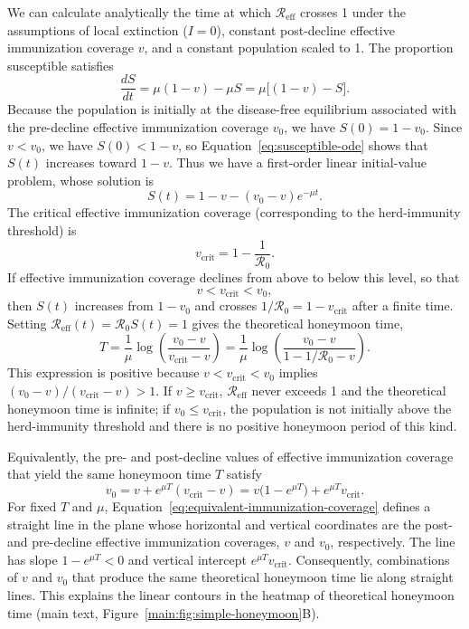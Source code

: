 \documentclass[12pt]{article}
\newcommand{\Rn}{{\mathcal R}_0}
\newcommand{\Reff}{{\mathcal R}_{\textrm{eff}}}
\newcommand{\vcrit}{v_{\textrm{crit}}}
\begin{document}
We can calculate analytically the time at which $\Reff$ crosses 1 under the assumptions of local extinction ($I=0$), constant post-decline effective immunization coverage $v$, and a constant population scaled to 1. The proportion susceptible satisfies
\begin{equation}
    \frac{dS}{dt}=\mu(1-v)-\mu S
    =\mu\bigl[(1-v)-S\bigr].
    \label{eq:susceptible-ode}
\end{equation}
Because the population is initially at the disease-free equilibrium associated with the pre-decline effective immunization coverage $v_0$, we have $S(0)=1-v_0$.  Since $v<v_0$, we have $S(0)<1-v$, so Equation~\eqref{eq:susceptible-ode} shows that $S(t)$ increases toward $1-v$.  Thus we have a first-order linear initial-value problem, whose solution is
\begin{equation}
    S(t)=1-v-(v_0-v)e^{-\mu t}.
    \label{eq:susceptible-solution}
\end{equation}
The critical effective immunization coverage (corresponding to the herd-immunity threshold) is
\begin{equation}
    \vcrit=1-\frac{1}{\Rn}.
    \label{eq:critical-immunization}
\end{equation}
If effective immunization coverage declines from above to below this level, so that
\begin{equation}
    v<\vcrit<v_0,
    \label{eq:finite-honeymoon-condition}
\end{equation}
then $S(t)$ increases from $1-v_0$ and crosses $1/\Rn=1-\vcrit$ after a finite time.  Setting $\Reff(t)=\Rn S(t)=1$ gives the theoretical honeymoon time,
\begin{equation}
    T=\frac{1}{\mu}
    \log\left(\frac{v_0-v}{\vcrit-v}\right)
    =\frac{1}{\mu}
    \log\left(\frac{v_0-v}{1-1/\Rn-v}\right).
    \label{eq:honeymoon-time}
\end{equation}
This expression is positive because $v<\vcrit<v_0$ implies $(v_0-v)/(\vcrit-v)>1$.  If $v\geq\vcrit$, $\Reff$ never exceeds 1 and the theoretical honeymoon time is infinite; if $v_0\leq\vcrit$, the population is not initially above the herd-immunity threshold and there is no positive honeymoon period of this kind.

Equivalently, the pre- and post-decline values of effective immunization coverage that yield the same honeymoon time $T$ satisfy
\begin{equation}
    v_0=v+e^{\mu T}(\vcrit-v)
       =v\bigl(1-e^{\mu T}\bigr)+e^{\mu T}\vcrit.
    \label{eq:equivalent-immunization-coverage}
\end{equation}
For fixed $T$ and $\mu$, Equation~\eqref{eq:equivalent-immunization-coverage} defines a straight line in the plane whose horizontal and vertical coordinates are the post- and pre-decline effective immunization coverages, $v$ and $v_0$, respectively.  The line has slope $1-e^{\mu T}<0$ and vertical intercept $e^{\mu T}\vcrit$.  Consequently, combinations of $v$ and $v_0$ that produce the same theoretical honeymoon time lie along straight lines.  This explains the linear contours in the heatmap of theoretical honeymoon time (main text, Figure~\ref{main:fig:simple-honeymoon}B).
\end{document}
